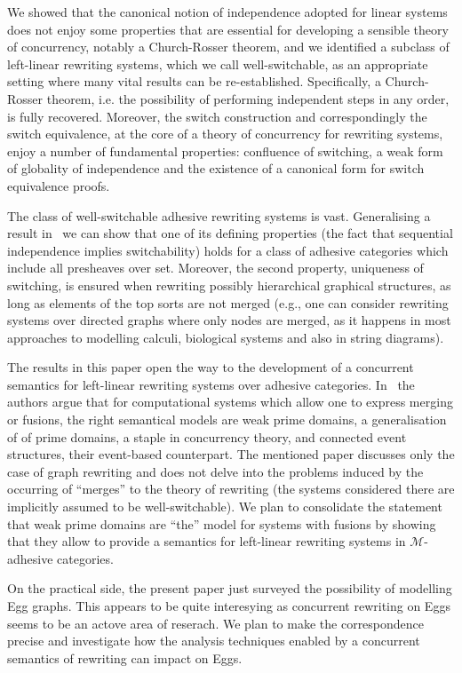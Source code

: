 \documentclass[a4paper,UKenglish,cleveref,pdftex,thm-restate,numberwithinsect,anonymous]{lipics}
\begin{document}
We showed that the canonical notion of independence adopted for linear
systems does not enjoy some properties that are essential for
developing a sensible theory of concurrency, notably a Church-Rosser
theorem, and we identified a subclass of left-linear rewriting systems,
which we call well-switchable, as an appropriate setting where 
many vital results can be re-established. Specifically, a Church-Rosser 
theorem, i.e. the possibility of performing independent steps in any order, is
fully recovered. Moreover, the switch construction and correspondingly
the switch equivalence, at the core of a theory of concurrency for
rewriting systems, enjoy a number of fundamental properties:
confluence of switching, a weak form of globality of independence and
the existence of a canonical form for switch equivalence proofs.

The class of well-switchable adhesive rewriting systems is vast. Generalising a result in~\cite{baldan2011adhesivity} 
we can show that one of its defining properties (the fact that sequential independence implies switchability) holds 
for a class of adhesive categories which include all presheaves over set. Moreover, the second property, uniqueness 
of switching, is ensured when rewriting possibly hierarchical graphical structures, as long as elements of the top sorts 
are not merged (e.g., one can consider rewriting systems over directed graphs where only nodes are merged, as it 
happens in most approaches to modelling calculi, biological systems and also in string diagrams).

The results in this paper open the way to the development of a
concurrent semantics for left-linear rewriting systems over adhesive
categories. In~\cite{baldan2017domains} the authors argue that for
computational systems which allow one to express merging or fusions,
the right semantical models are weak prime domains, a generalisation of
of prime domains, a staple in concurrency theory, and connected event
structures, their event-based counterpart. The mentioned paper
discusses only the case of graph rewriting and does not delve into the
problems induced by the occurring of ``merges'' to the theory of rewriting (the systems
considered there are implicitly assumed to be well-switchable). 
We plan to consolidate the statement that weak prime domains are 
``the'' model for systems with fusions by showing that they allow to provide a semantics
for left-linear rewriting systems in $\mathcal{M}$-adhesive categories.

On the practical side, the present paper just surveyed the possibility
of modelling Egg graphs. This appears to be quite interesying as
concurrent rewriting on Eggs seems to be an actove area of
reserach.  We plan to make the correspondence precise
and investigate how the analysis techniques enabled by a concurrent
semantics of rewriting can impact on Eggs.
\end{document}
